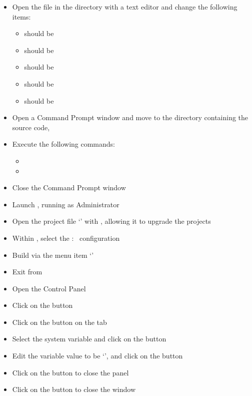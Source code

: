 \begin{itemize}
\item Open the file  in the
 directory with a text editor and change the
following items:
\begin{itemize}
\item {} should be 
\item\exSp{} should be 
\item\exSp{} should be 
\item\exSp{} should be 
\item\exSp{} should be 
\end{itemize}
\item\exSp{}Open a Command Prompt window and move to the directory containing the
\mplusm{} source code, 
\item\exSp{}Execute the following commands:
\begin{itemize}
\item {}
\item\exSp{}
\end{itemize}
\item\exSp{}Close the Command Prompt window
\item\exSp{}Launch , running as Administrator
\item\exSp{}Open the project file
`' with
, allowing it to upgrade the projects
\item\exSp{}Within , select the  :\ 
configuration
\item\exSp{}Build via the menu item `'
\item\exSp{}Exit from 
\item\exSp{}Open the  Control Panel
\item\exSp{}Click on the  button
\item\exSp{}Click on the  button on the 
tab
\item\exSp{}Select the  system variable and click on the 
button 
\item\exSp{}Edit the variable value to be `',
and click on the  button
\item\exSp{}Click on the  button to close the 
panel
\item\exSp{}Click on the  button to close the 
window
\end{itemize}
